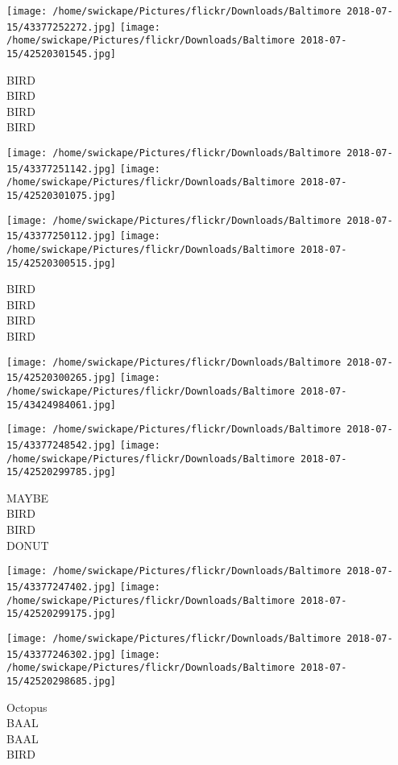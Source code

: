 \documentclass[10pt,letterpaper]{article}
\begin{document}
\texttt{[image: /home/swickape/Pictures/flickr/Downloads/Baltimore 2018-07-15/43377252272.jpg]}
\texttt{[image: /home/swickape/Pictures/flickr/Downloads/Baltimore 2018-07-15/42520301545.jpg]}

BIRD\\
BIRD\\
BIRD\\
BIRD
\pagebreak

\texttt{[image: /home/swickape/Pictures/flickr/Downloads/Baltimore 2018-07-15/43377251142.jpg]}
\texttt{[image: /home/swickape/Pictures/flickr/Downloads/Baltimore 2018-07-15/42520301075.jpg]}

\texttt{[image: /home/swickape/Pictures/flickr/Downloads/Baltimore 2018-07-15/43377250112.jpg]}
\texttt{[image: /home/swickape/Pictures/flickr/Downloads/Baltimore 2018-07-15/42520300515.jpg]}

BIRD\\
BIRD\\
BIRD\\
BIRD
\pagebreak

\texttt{[image: /home/swickape/Pictures/flickr/Downloads/Baltimore 2018-07-15/42520300265.jpg]}
\texttt{[image: /home/swickape/Pictures/flickr/Downloads/Baltimore 2018-07-15/43424984061.jpg]}

\texttt{[image: /home/swickape/Pictures/flickr/Downloads/Baltimore 2018-07-15/43377248542.jpg]}
\texttt{[image: /home/swickape/Pictures/flickr/Downloads/Baltimore 2018-07-15/42520299785.jpg]}

MAYBE\\
BIRD\\
BIRD\\
DONUT
\pagebreak

\texttt{[image: /home/swickape/Pictures/flickr/Downloads/Baltimore 2018-07-15/43377247402.jpg]}
\texttt{[image: /home/swickape/Pictures/flickr/Downloads/Baltimore 2018-07-15/42520299175.jpg]}

\texttt{[image: /home/swickape/Pictures/flickr/Downloads/Baltimore 2018-07-15/43377246302.jpg]}
\texttt{[image: /home/swickape/Pictures/flickr/Downloads/Baltimore 2018-07-15/42520298685.jpg]}

Octopus\\
BAAL\\
BAAL\\
BIRD
\pagebreak
\end{document}
